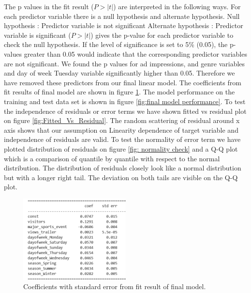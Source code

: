 \documentclass[12pt,a4paper]{style}
\begin{document}
	The p values in the fit result ($P > |t|$) are interpreted in the following ways.	
		For each predictor variable there is a null hypothesis and alternate hypothesis.
			Null hypothesis : Predictor variable is not significant
			Alternate hypothesis : Predictor variable is significant
		($P > |t|$) gives the p-value for each predictor variable to check the null hypothesis.
		If the level of significance is set to 5\% (0.05), the p-values greater than 0.05 would indicate that the corresponding predictor variables are not significant.
	We found the p values for ad impressions, and genre variables and day of week Tuesday variable significantly higher than 0.05. Therefore we have removed these predictors from our final linear model. The coefficients from fit results of final model are shown in figure \ref{fig:coeff}. The model performance on the training and test data set is shown in figure \ref{fig:final model performance}. To test the independence of residuals or error terms we have shown fitted vs residual plot on figure \ref{fig:Fitted_Vs_Residual}. The random scattering of residual around x axis shows that our assumption on Linearity dependence of target variable and independence of residuals are valid. To test the normality of error term we have plotted distribution of residuals on figure \ref{fig: normality check} and a Q-Q plot which is a comparison of quantile by quantile with respect to the normal distribution. The distribution of residuals closely look like a normal distribution but with a longer right tail. The deviation on both tails are visible on the Q-Q plot.  
\begin{figure}[h]
	\centering
	\includegraphics[width=0.5\textwidth]{final_coeff.png}
	\caption{\small{Coefficients with standard error from fit result of final model.}}
	\label{fig:coeff}
\end{figure}
\end{document}

